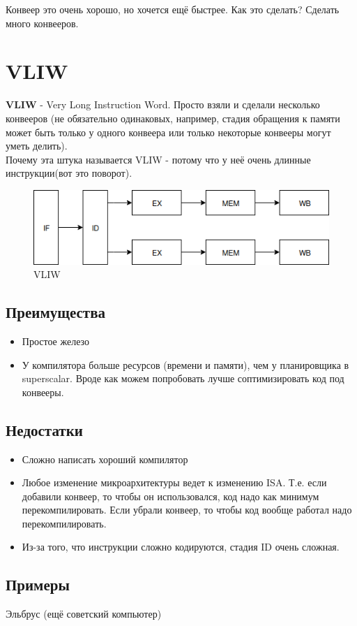 \documentclass[12pt, a4paper]{article}
\begin{document}
Конвеер это очень хорошо, но хочется ещё быстрее. Как это сделать? Сделать много конвееров.
\section{VLIW}
\textbf{VLIW} - Very Long Instruction Word. Просто взяли и сделали несколько конвееров (не обязательно одинаковых, например, стадия обращения к памяти может быть только у одного конвеера или только некоторые конвееры могут уметь делить).\\
Почему эта штука называется VLIW - потому что у неё очень длинные инструкции(вот это поворот).
\begin{figure}[h]
    \centering
    \includegraphics[width=0.8\linewidth]{images/VLIW.png}
    \caption{VLIW}
    \label{fig:VLIW}
\end{figure}
\subsection{Преимущества}
\begin{itemize}
    \item Простое железо
    \item У компилятора больше ресурсов (времени и памяти), чем у планировщика в superscalar. Вроде как можем попробовать лучше соптимизировать код под конвееры. 
\end{itemize}
\subsection{Недостатки}
\begin{itemize}
    \item Сложно написать хороший компилятор
    \item Любое изменение микроархитектуры ведет к изменению ISA. Т.е. если добавили конвеер, то чтобы он использовался, код надо как минимум перекомпилировать. Если убрали конвеер, то чтобы код вообще работал надо перекомпилировать.
    \item Из-за того, что инструкции сложно кодируются, стадия ID очень сложная. 
\end{itemize}
\subsection{Примеры}
Эльбрус (ещё советский компьютер)
\end{document}

